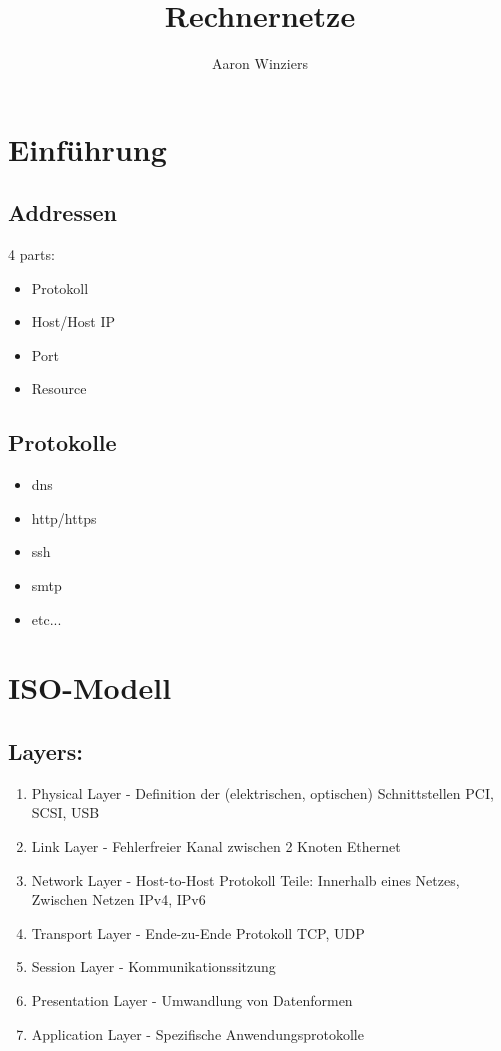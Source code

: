 \documentclass[10pt,a4paper]{article}
\author{Aaron Winziers}
\title{Rechnernetze}
\begin{document}
	\maketitle
	\tableofcontents
\section{Einführung}
	\subsection{Addressen}
		4 parts: 
			\begin{itemize}
				\item Protokoll
				\item Host/Host IP
				\item Port
				\item Resource
			\end{itemize}
	\subsection{Protokolle}	
		\begin{itemize}
			\item dns
			\item http/https
			\item ssh
			\item smtp
			\item etc...
		\end{itemize}
	
	
\section{ISO-Modell}
	\subsection{Layers:}
		\begin{enumerate}
			\item Physical Layer - Definition der (elektrischen, optischen) Schnittstellen
			\subitem PCI, SCSI, USB
			\item Link Layer - Fehlerfreier Kanal zwischen 2 Knoten
			\subitem Ethernet
			\item Network Layer - Host-to-Host Protokoll
			 Teile: Innerhalb eines Netzes, Zwischen Netzen
			\subitem IPv4, IPv6
			\item Transport Layer - Ende-zu-Ende Protokoll
			\subitem TCP, UDP
			\item Session Layer - Kommunikationssitzung
			\item Presentation Layer - Umwandlung von Datenformen
			\item Application Layer - Spezifische Anwendungsprotokolle 
		\end{enumerate}
\end{document}
